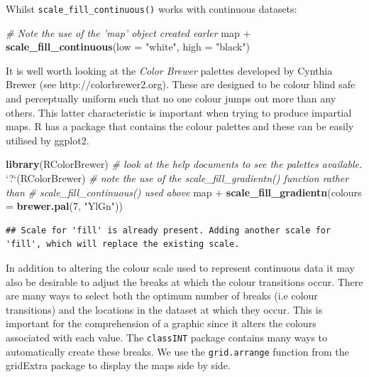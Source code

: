 \documentclass[]{article}
\newenvironment{Shaded}{}{}
\newcommand{\KeywordTok}[1]{\textcolor[rgb]{0.00,0.44,0.13}{\textbf{{#1}}}}
\newcommand{\DataTypeTok}[1]{\textcolor[rgb]{0.56,0.13,0.00}{{#1}}}
\newcommand{\DecValTok}[1]{\textcolor[rgb]{0.25,0.63,0.44}{{#1}}}
\newcommand{\StringTok}[1]{\textcolor[rgb]{0.25,0.44,0.63}{{#1}}}
\newcommand{\CommentTok}[1]{\textcolor[rgb]{0.38,0.63,0.69}{\textit{{#1}}}}
\newcommand{\NormalTok}[1]{{#1}}
\begin{document}
Whilst \texttt{scale\_fill\_continuous()} works with continuous
datasets:

\begin{Shaded}
\begin{Highlighting}[]
\CommentTok{# Note the use of the 'map' object created earler}
\NormalTok{map +}\StringTok{ }\KeywordTok{scale_fill_continuous}\NormalTok{(}\DataTypeTok{low =} \StringTok{"white"}\NormalTok{, }\DataTypeTok{high =} \StringTok{"black"}\NormalTok{)}
\end{Highlighting}
\end{Shaded}

It is well worth looking at the \emph{Color Brewer} palettes developed
by Cynthia Brewer (see http://colorbrewer2.org). These are designed to
be colour blind safe and perceptually uniform such that no one colour
jumps out more than any others. This latter characteristic is important
when trying to produce impartial maps. R has a package that contains the
colour palettes and these can be easily utilised by ggplot2.

\begin{Shaded}
\begin{Highlighting}[]
\KeywordTok{library}\NormalTok{(RColorBrewer)}
\CommentTok{# look at the help documents to see the palettes available.}
\StringTok{`}\DataTypeTok{?}\StringTok{`}\NormalTok{(RColorBrewer)}
\CommentTok{# note the use of the scale_fill_gradientn() function rather than}
\CommentTok{# scale_fill_continuous() used above}
\NormalTok{map +}\StringTok{ }\KeywordTok{scale_fill_gradientn}\NormalTok{(}\DataTypeTok{colours =} \KeywordTok{brewer.pal}\NormalTok{(}\DecValTok{7}\NormalTok{, }\StringTok{"YlGn"}\NormalTok{))}
\end{Highlighting}
\end{Shaded}

\begin{verbatim}
## Scale for 'fill' is already present. Adding another scale for 'fill', which will replace the existing scale.
\end{verbatim}

In addition to altering the colour scale used to represent continuous
data it may also be desirable to adjust the breaks at which the colour
transitions occur. There are many ways to select both the optimum number
of breaks (i.e colour transitions) and the locations in the dataset at
which they occur. This is important for the comprehension of a graphic
since it alters the colours associated with each value. The
\texttt{classINT} package contains many ways to automatically create
these breaks. We use the \texttt{grid.arrange} function from the
gridExtra package to display the maps side by side.
\end{document}
